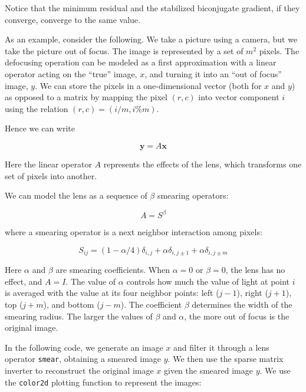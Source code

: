 \documentclass[justified,sixbynine]{tufte-book}
\def\ft{\small\tt}
\theoremstyle{plain}%
\theoremstyle{definition}
\theoremstyle{remark}
\begin{document}
\begin{fullwidth}
Notice that the minimum residual and the stabilized biconjugate gradient, if they converge, converge to the same value.

As an example, consider the following. We take a picture using a camera, but we take the picture out of focus. The image is represented by a set of $m^2$ pixels. The defocusing operation can be modeled as a first approximation with a linear operator acting on the ``true'' image, $x$, and turning it into an ``out of focus'' image, $y$. We can store the pixels in a one-dimensional vector (both for $x$ and $y$) as opposed to a matrix by mapping the pixel $(r,c)$ into vector component $i$ using the relation $(r,c) = (i/m,i\%m)$.

Hence we can write

\begin{equation}
\mathbf{y} = A \mathbf{x}
\end{equation}

Here the linear operator $A$ represents the effects of the lens, which transforms one set of pixels into another.

We can model the lens as a sequence of $\beta$ smearing operators:

\begin{equation}
A = S^{\beta}
\end{equation}

where a smearing operator is a next neighbor interaction among pixels:

\begin{equation}
S_{ij} = (1-\alpha/4) \delta_{i,j} + \alpha \delta_{i,j\pm 1} + \alpha \delta_{i,j\pm m}
\end{equation}

Here $\alpha$ and $\beta$ are smearing coefficients. When $\alpha=0$ or $\beta=0$, the lens has no effect, and $A = I$. The value of $\alpha$ controls how much the value of light at point $i$ is averaged with the value at its four neighbor points: left ($j-1$), right ($j+1$), top ($j+m$), and bottom ($j-m$). The coefficient $\beta$ determines the width of the smearing radius. The larger the values of $\beta$ and $\alpha$, the more out of focus is the original image.


In the following code, we generate an image $x$ and filter it through a lens operator {\ft smear}, obtaining a smeared image $y$. We then use the sparse matrix inverter to reconstruct the original image $x$ given the smeared image $y$. We use the {\ft color2d} plotting function to represent the images:


\end{fullwidth}
\end{document}
